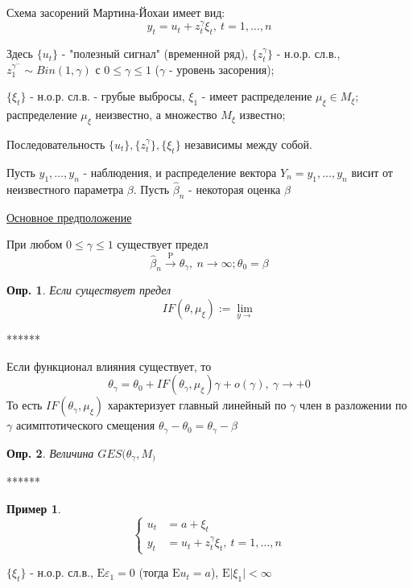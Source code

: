 \documentclass[12pt]{article}
\newtheorem{definition}{Опр.}
\newtheorem*{example}{Пример}
\theoremstyle{basic_theorem}
\theoremstyle{name_theorem}
\def\eps{
    \varepsilon
}
\def\E{
    \mathrm{E}
}
\def\P{
    \mathrm{P}
}
\begin{document}
    Схема засорений Мартина-Йохаи имеет вид:
    $$y_t = u_t + z^\gamma_t\xi_t,\ t = 1, \ldots, n$$

    Здесь $\{u_t\}$ - "полезный сигнал" (временной ряд),
    $\{z_t^\gamma\}$ - н.о.р. сл.в., $z_1^{\gamma^-} \sim Bin(1, \gamma)$
    с $0 \leq \gamma\leq1$ ($\gamma$ - уровень засорения);

    $\{\xi_t\}$ - н.о.р. сл.в. - грубые выбросы, $\xi_1$ - имеет распределение
    $\mu_\xi\in M_\xi$; распределение $\mu_\xi$ неизвестно, а множество $M_\xi$
    известно;

    Последовательность $\{u_t\}, \{z^\gamma_t\}, \{\xi_t\}$ независимы между собой.

    Пусть $y_1, \ldots, y_n$ - наблюдения, и распределение
    вектора $Y_n=y_1, \ldots, y_n$ висит от неизвестного параметра $\beta$.
    Пусть $\hat{\beta}_n$ - некоторая оценка $\beta$

    \underline{Основное предположение}

    При любом $0 \leq \gamma\leq1$ существует предел
    $$\hat{\beta}_n\xrightarrow{\P}\theta_\gamma,\ n\rightarrow\infty;\theta_0=\beta$$

    \begin{definition}
        Если существует предел
        $$IF(\theta, \mu_\xi):=\lim_{y\rightarrow}$$
    \end{definition}


    ******

    Если функционал влияния существует, то 
    $$\theta_\gamma = \theta_0 + IF(\theta_\gamma, \mu_\xi)\gamma + o(\gamma),\ \gamma\rightarrow+0$$
    То есть $IF(\theta_\gamma, \mu_\xi)$ характеризует главный линейный по
    $\gamma$ член в разложении по $\gamma$ асимптотического смещения $\theta_\gamma - \theta_0=\theta_\gamma-\beta$

    \begin{definition}
        Величина $GES(\theta_\gamma,M_)$
    \end{definition}

    ******

    \begin{example}
        $$\begin{cases}
            u_t &= a + \xi_t \\
            y_t &= u_t + z^\gamma_t\xi_t, \ t=1,\ldots,n
        \end{cases}$$
    \end{example}
    $\{\xi_t\}$ - н.о.р. сл.в., $\E\eps_1=0$ (тогда $\E u_t=a$),
    $\E\vert\xi_1\vert<\infty$
    
\end{document}
